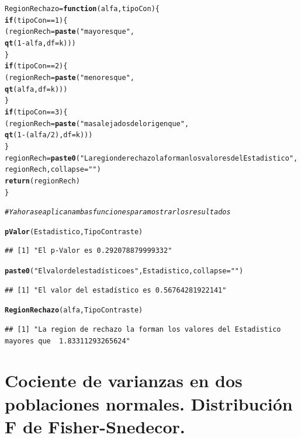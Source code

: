 \documentclass[10pt,a4paper]{article}\usepackage[]{graphicx}\usepackage[]{color}
\makeatletter
\newcommand{\hlnum}[1]{\textcolor[rgb]{0.686,0.059,0.569}{#1}}%
\newcommand{\hlstr}[1]{\textcolor[rgb]{0.192,0.494,0.8}{#1}}%
\newcommand{\hlcom}[1]{\textcolor[rgb]{0.678,0.584,0.686}{\textit{#1}}}%
\newcommand{\hlopt}[1]{\textcolor[rgb]{0,0,0}{#1}}%
\newcommand{\hlstd}[1]{\textcolor[rgb]{0.345,0.345,0.345}{#1}}%
\newcommand{\hlkwa}[1]{\textcolor[rgb]{0.161,0.373,0.58}{\textbf{#1}}}%
\newcommand{\hlkwb}[1]{\textcolor[rgb]{0.69,0.353,0.396}{#1}}%
\newcommand{\hlkwc}[1]{\textcolor[rgb]{0.333,0.667,0.333}{#1}}%
\newcommand{\hlkwd}[1]{\textcolor[rgb]{0.737,0.353,0.396}{\textbf{#1}}}%
\newenvironment{kframe}{%
 \def\at@end@of@kframe{}%
 \ifinner\ifhmode%
  \def\at@end@of@kframe{\end{minipage}}%
  \begin{minipage}{\columnwidth}%
 \fi\fi%
 \def\FrameCommand##1{\hskip\@totalleftmargin \hskip-\fboxsep
 \colorbox{shadecolor}{##1}\hskip-\fboxsep
     \hskip-\linewidth \hskip-\@totalleftmargin \hskip\columnwidth}%
 \MakeFramed {\advance\hsize-\width
   \@totalleftmargin\z@ \linewidth\hsize
   \@setminipage}}%
 {\par\unskip\endMakeFramed%
 \at@end@of@kframe}
\newenvironment{knitrout}{}{} %
\makeatother
\begin{document}
\begin{knitrout}
\begin{kframe}
\begin{alltt}
    \hlstd{RegionRechazo} \hlkwb{=} \hlkwa{function}\hlstd{(}\hlkwc{alfa}\hlstd{,} \hlkwc{tipoCon}\hlstd{)\{}
      \hlkwa{if}\hlstd{(tipoCon} \hlopt{==} \hlnum{1}\hlstd{)\{}
        \hlstd{(regionRech} \hlkwb{=} \hlkwd{paste}\hlstd{(}\hlstr{"mayores que "}\hlstd{,}
                            \hlkwd{qt}\hlstd{(}\hlnum{1} \hlopt{-} \hlstd{alfa,} \hlkwc{df}\hlstd{=k)))}
      \hlstd{\}}
      \hlkwa{if}\hlstd{(tipoCon} \hlopt{==} \hlnum{2}\hlstd{)\{}
        \hlstd{(regionRech} \hlkwb{=} \hlkwd{paste}\hlstd{(}\hlstr{"menores que "}\hlstd{,}
                            \hlkwd{qt}\hlstd{(alfa,} \hlkwc{df}\hlstd{=k)))}
      \hlstd{\}}
      \hlkwa{if}\hlstd{(tipoCon} \hlopt{==} \hlnum{3}\hlstd{)\{}
        \hlstd{(regionRech} \hlkwb{=} \hlkwd{paste}\hlstd{(}\hlstr{"mas alejados del origen que "}\hlstd{,}
                            \hlkwd{qt}\hlstd{(}\hlnum{1} \hlopt{-} \hlstd{(alfa}\hlopt{/}\hlnum{2}\hlstd{),} \hlkwc{df}\hlstd{=k)))}
      \hlstd{\}}
      \hlstd{regionRech} \hlkwb{=} \hlkwd{paste0}\hlstd{(}\hlstr{"La region de rechazo la forman los valores del Estadistico "}\hlstd{,}
                         \hlstd{regionRech,} \hlkwc{collapse}\hlstd{=}\hlstr{""}\hlstd{)}
      \hlkwd{return}\hlstd{(regionRech)}
    \hlstd{\}}

\hlcom{# Y ahora se aplican ambas funciones para mostrar los resultados}

\hlkwd{pValor}\hlstd{(Estadistico, TipoContraste)}
\end{alltt}
\begin{verbatim}
## [1] "El p-Valor es 0.292078879999332"
\end{verbatim}
\begin{alltt}
\hlkwd{paste0}\hlstd{(}\hlstr{"El valor del estadístico es "}\hlstd{, Estadistico,} \hlkwc{collapse} \hlstd{=} \hlstr{""}\hlstd{)}
\end{alltt}
\begin{verbatim}
## [1] "El valor del estadístico es 0.56764281922141"
\end{verbatim}
\begin{alltt}
\hlkwd{RegionRechazo}\hlstd{(alfa, TipoContraste)}
\end{alltt}
\begin{verbatim}
## [1] "La region de rechazo la forman los valores del Estadistico mayores que  1.83311293265624"
\end{verbatim}
\end{kframe}
\end{knitrout}


\section{Cociente de varianzas en dos poblaciones normales. Distribución F de Fisher-Snedecor.}
\end{document}
